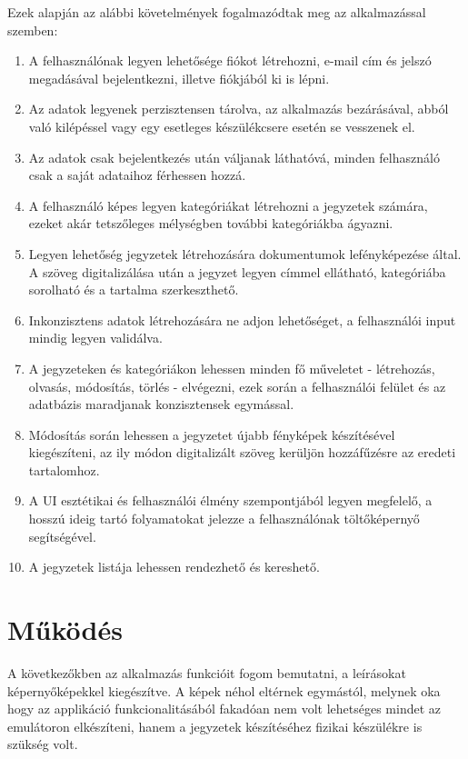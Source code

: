 Ezek alapján az alábbi követelmények fogalmazódtak meg az alkalmazással szemben:
\begin{enumerate}
	\item A felhasználónak legyen lehetősége fiókot létrehozni, e-mail cím és jelszó megadásával bejelentkezni, illetve fiókjából ki is lépni.
	\item Az adatok legyenek perzisztensen tárolva, az alkalmazás bezárásával, abból való kilépéssel vagy egy esetleges készülékcsere esetén se vesszenek el.
	\item Az adatok csak bejelentkezés után váljanak láthatóvá, minden felhasználó csak a saját adataihoz férhessen hozzá.
	\item A felhasználó képes legyen kategóriákat létrehozni a jegyzetek számára, ezeket akár tetszőleges mélységben további kategóriákba ágyazni.
	\item Legyen lehetőség jegyzetek létrehozására dokumentumok lefényképezése által. A szöveg digitalizálása után a jegyzet legyen címmel ellátható, kategóriába sorolható és a tartalma szerkeszthető.
	\item Inkonzisztens adatok létrehozására ne adjon lehetőséget, a felhasználói input mindig legyen validálva.
	\item A jegyzeteken és kategóriákon lehessen minden fő műveletet - létrehozás, olvasás, módosítás, törlés - elvégezni, ezek során a felhasználói felület és az adatbázis maradjanak konzisztensek egymással.
	\item Módosítás során lehessen a jegyzetet újabb fényképek készítésével kiegészíteni, az ily módon digitalizált szöveg kerüljön hozzáfűzésre az eredeti tartalomhoz.
	\item A UI esztétikai és felhasználói élmény szempontjából legyen megfelelő, a hosszú ideig tartó folyamatokat jelezze a felhasználónak töltőképernyő segítségével.
	\item A jegyzetek listája lehessen rendezhető és kereshető.
\end{enumerate}

\section{Működés}

A következőkben az alkalmazás funkcióit fogom bemutatni, a leírásokat képernyőképekkel kiegészítve. A képek néhol eltérnek egymástól, melynek oka hogy az applikáció funkcionalitásából fakadóan nem volt lehetséges mindet az emulátoron elkészíteni, hanem a jegyzetek készítéséhez fizikai készülékre is szükség volt.

